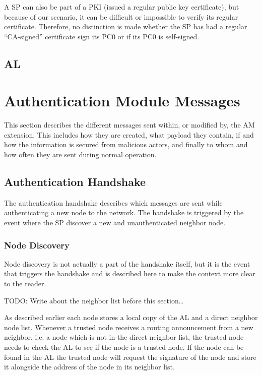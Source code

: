 A \ac{SP} can also be part of a \ac{PKI} (issued a regular public key
certificate), but because of our scenario, it can be difficult or impossible to
verify its regular certificate. Therefore, no distinction is made whether the
\ac{SP} has had a regular ``\ac{CA}-signed'' certificate sign its \ac{PC0} or if
its \ac{PC0} is self-signed.


\subsection{\acf{AL}}


\section{Authentication Module Messages}
This section describes the different messages sent within, or modified by, the
\ac{AM} extension. This includes how they are created, what payload they
contain, if and how the information is secured from malicious actors, and
finally to whom and how often they are sent during normal operation.

\subsection{Authentication Handshake}
The authentication handshake describes which messages are sent while
authenticating a new node to the network. The handshake is triggered by the
event where the \ac{SP} discover a new and unauthenticated neighbor node.

\subsubsection*{Node Discovery}
Node discovery is not actually a part of the handshake itself, but it is the
event that triggers the handshake and is described here to make the context more
clear to the reader.

TODO: Write about the neighbor list before this section\ldots

As described earlier each node stores a local copy of the \ac{AL} and a direct
neighbor node list. Whenever a trusted node receives a routing announcement from
a new neighbor, i.e. a node which is not in the direct neighbor list, the
trusted node needs to check the \ac{AL} to see if the node is a trusted node. If
the node can be found in the \ac{AL} the trusted node will request the signature
of the node and store it alongside the address of the node in its neighbor list.

